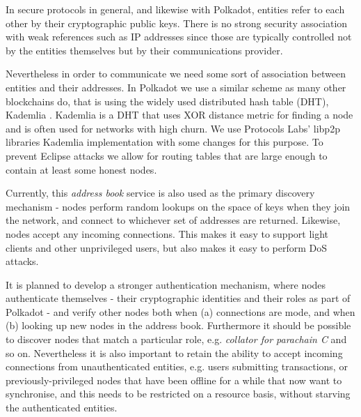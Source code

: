 In secure protocols in general, and likewise with Polkadot, entities refer to each other by their cryptographic public keys. There is no strong security association with weak references such as IP addresses since those are typically controlled not by the entities themselves but by their communications provider.

Nevertheless in order to communicate we need some sort of association between entities and their addresses. In Polkadot we use a similar scheme as many other blockchains do, that is using the widely used distributed hash table (DHT), Kademlia \cite{Maymounkov:2002:Kademila}. Kademlia is a DHT that uses XOR distance metric for finding a node and is often used for networks with high churn. We use Protocols Labs' libp2p libraries \cite{} Kademlia implementation with some changes for this purpose. To prevent Eclipse attacks \cite{eclipseattack} we allow for routing tables that are large enough to contain at least some honest nodes.

Currently, this \emph{address book} service is also used as the primary discovery mechanism - nodes perform random lookups on the space of keys when they join the network, and connect to whichever set of addresses are returned. Likewise, nodes accept any incoming connections. This makes it easy to support light clients and other unprivileged users, but also makes it easy to perform DoS attacks.

It is planned to develop a stronger authentication mechanism, where nodes authenticate themselves - their cryptographic identities and their roles as part of Polkadot - and verify other nodes both when (a) connections are mode, and when (b) looking up new nodes in the address book. Furthermore it should be possible to discover nodes that match a particular role, e.g. \emph{collator for parachain C} and so on. Nevertheless it is also important to retain the ability to accept incoming connections from unauthenticated entities, e.g. users submitting transactions, or previously-privileged nodes that have been offline for a while that now want to synchronise, and this needs to be restricted on a resource basis, without starving the authenticated entities.
